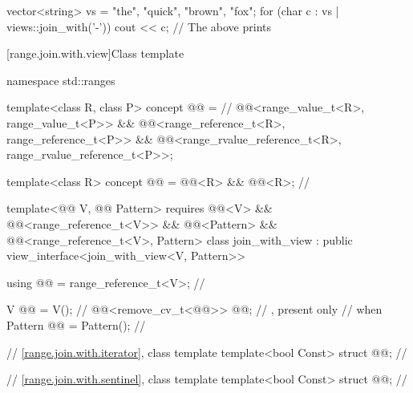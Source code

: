 \pnum
\begin{example}
\begin{codeblock}
vector<string> vs = {"the", "quick", "brown", "fox"};
for (char c : vs | views::join_with('-')) {
  cout << c;
}
// The above prints 
\end{codeblock}
\end{example}

[range.join.with.view]{Class template }

\begin{codeblock}
namespace std::ranges {
  template<class R, class P>
  concept @@ =            // \expos
      @@<range_value_t<R>, range_value_t<P>> &&
      @@<range_reference_t<R>, range_reference_t<P>> &&
      @@<range_rvalue_reference_t<R>, range_rvalue_reference_t<P>>;

  template<class R>
  concept @@ = @@<R> && @@<R>;    // \expos

  template<@@ V, @@ Pattern>
    requires @@<V> && @@<range_reference_t<V>>
          && @@<Pattern>
          && @@<range_reference_t<V>, Pattern>
  class join_with_view : public view_interface<join_with_view<V, Pattern>> {
    using @@ = range_reference_t<V>;                  // \expos

    V @@ = V();                                          // \expos
    @@<remove_cv_t<@@>> @@;   // \expos, present only
                                                            // when 
    Pattern @@ = Pattern();                           // \expos

    // \ref{range.join.with.iterator}, class template 
    template<bool Const> struct @@;                   // \expos

    // \ref{range.join.with.sentinel}, class template 
    template<bool Const> struct @@;                   // \expos

}}
\end{codeblock}
